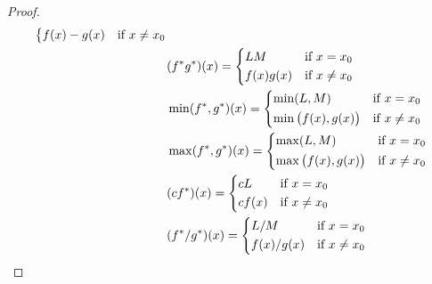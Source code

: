 \begin{proof}
\begin{align*}
\begin{dcases}
                                                       f(x) - g(x) & \text{if } x \neq x_0
                                                     \end{dcases}                     \\
                                  & (f^* g^*)(x) = \begin{dcases}
                                                     LM        & \text{if } x = x_0    \\
                                                     f(x) g(x) & \text{if } x \neq x_0
                                                   \end{dcases}                         \\
                                  & \min(f^*, g^*)(x) = \begin{dcases}
                                                          \min(L, M)               & \text{if } x = x_0    \\
                                                          \min\big(f(x), g(x)\big) & \text{if } x \neq x_0
                                                        \end{dcases}     \\
                                  & \max(f^*, g^*)(x) = \begin{dcases}
                                                          \max(L, M)               & \text{if } x = x_0    \\
                                                          \max\big(f(x), g(x)\big) & \text{if } x \neq x_0
                                                        \end{dcases}     \\
                                  & (c f^*)(x) = \begin{dcases}
                                                   cL     & \text{if } x = x_0    \\
                                                   c f(x) & \text{if } x \neq x_0
                                                 \end{dcases}                              \\
                                  & (f^* / g^*)(x) = \begin{dcases}
                                                       L / M       & \text{if } x = x_0    \\
                                                       f(x) / g(x) & \text{if } x \neq x_0

\end{dcases}
\end{align*}
\end{proof}
